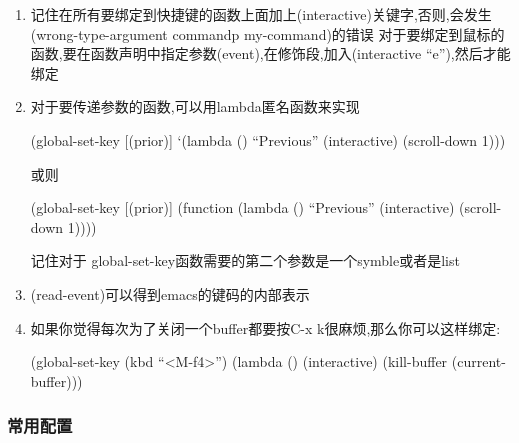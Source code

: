 \documentclass[11pt]{article}
\begin{document}
\begin{enumerate}
\item 记住在所有要绑定到快捷键的函数上面加上(interactive)关键字,否则,会发生(wrong-type-argument commandp my-command)的错误
    对于要绑定到鼠标的函数,要在函数声明中指定参数(event),在修饰段,加入(interactive ``e''),然后才能绑定
\item 对于要传递参数的函数,可以用lambda匿名函数来实现

    (global-set-key [(prior)]
        `(lambda () ``Previous'' (interactive) (scroll-down 1)))

    或则

    (global-set-key [(prior)]
        (function (lambda () ``Previous'' (interactive) (scroll-down 1))))

    记住对于 global-set-key函数需要的第二个参数是一个symble或者是list
\item (read-event)可以得到emacs的键码的内部表示
\item 如果你觉得每次为了关闭一个buffer都要按C-x k很麻烦,那么你可以这样绑定:

    (global-set-key (kbd ``<M-f4>'') (lambda () (interactive) (kill-buffer (current-buffer)))
\end{enumerate}
\subsubsection{常用配置}
\label{sec-2.3}
\end{document}
